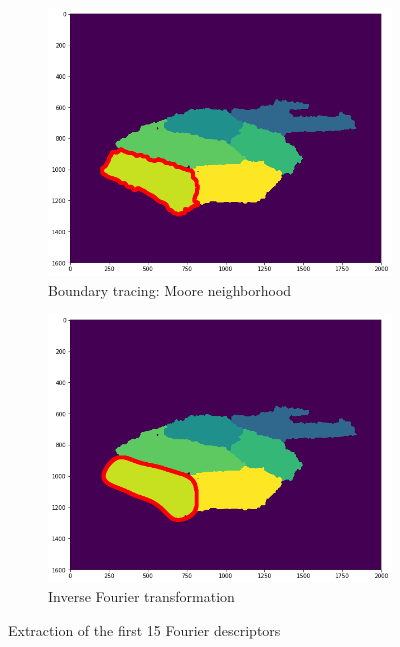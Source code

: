 \documentclass[a4paper]{article}
\begin{document}
\begin{figure}
    \begin{subfigure}{0.45\textwidth}
  \centering
    \includegraphics[width=\linewidth]{figures/boundary.png}
        \caption{Boundary tracing: Moore neighborhood}
    \end{subfigure}
\begin{subfigure}{0.45\textwidth}
  \centering
    \includegraphics[width=\linewidth]{figures/fourier.png}
    \caption{Inverse Fourier transformation}
    \end{subfigure}
    \caption{Extraction of the first 15 Fourier descriptors}

\end{figure}
\end{document}
